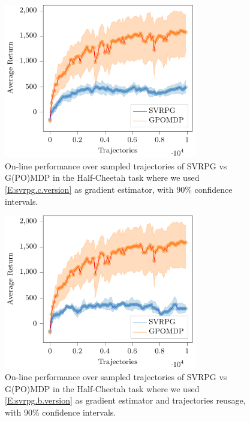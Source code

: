 \begin{figure}[h]
	\begin{minipage}[h]{1\textwidth}
		\centering
		\includegraphics[width=0.75\textwidth]{Images/Experiments/half_cheetah_GPOMDP_vs_NonSelf_SVRPG_C.pdf}
		\vspace{-0.1in}
		\caption{On-line performance over sampled trajectories of \acs{SVRPG} vs G(PO)MDP in the Half-Cheetah task where we used \ref{E:svrpg.c.version} as gradient estimator, with 90\% confidence intervals.}
		\label{fig:hcfour}
	\end{minipage}
	\vspace{-0.15in}
\end{figure}

\begin{figure}[h]
	\begin{minipage}[h]{1\textwidth}
		\centering
		\includegraphics[width=0.75\textwidth]{Images/Experiments/half_cheetah_GPOMDP_vs_SVRPG_B_reuse.pdf}
		\vspace{-0.1in}
		\caption{On-line performance over sampled trajectories of \acs{SVRPG} vs G(PO)MDP in the Half-Cheetah task where we used \ref{E:svrpg.b.version} as gradient estimator and trajectories reusage, with 90\% confidence intervals.}
		\label{fig:hcnine}
	\end{minipage}
	\vspace{-0.15in}
\end{figure}


